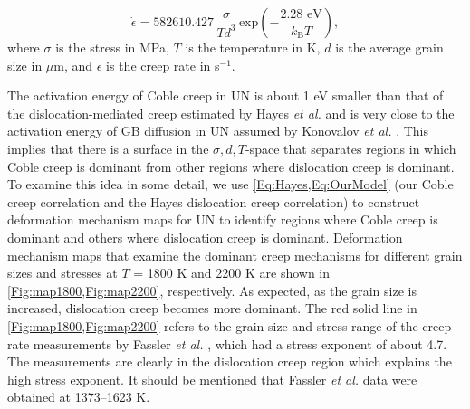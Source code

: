 \documentclass[preprint,12pt,sort&compress]{elsarticle} %
\newcommand{\?}{\stackrel{?}{=}}
\providecommand{\DIFaddbegin}{\protect\color{blue}} %
\providecommand{\DIFaddend}{\protect\color{black}} %
\providecommand{\DIFdelbegin}{\protect\color{red}} %
\providecommand{\DIFdelend}{\protect\color{black}} %
\newcommand{\DIFscaledelfig}{0.5}
\newlength{\DIFdelgraphicswidth} %
\newlength{\DIFdelgraphicsheight} %
\newcommand{\DIFaddincludegraphics}[2][]{{\color{blue}\fbox{\DIFOincludegraphics[#1]{#2}}}} %
\newcommand{\DIFdelincludegraphics}[2][]{%
\sbox{\DIFdelgraphicsbox}{\DIFOincludegraphics[#1]{#2}}%
\settoboxwidth{\DIFdelgraphicswidth}{\DIFdelgraphicsbox} %
\settoboxtotalheight{\DIFdelgraphicsheight}{\DIFdelgraphicsbox} %
\scalebox{\DIFscaledelfig}{%
\parbox[b]{\DIFdelgraphicswidth}{\usebox{\DIFdelgraphicsbox}\\[-\baselineskip] \rule{\DIFdelgraphicswidth}{0em}}\llap{\resizebox{\DIFdelgraphicswidth}{\DIFdelgraphicsheight}{%
\setlength{\unitlength}{\DIFdelgraphicswidth}%
\begin{picture}(1,1)%
\thicklines\linethickness{2pt} %
{\color[rgb]{1,0,0}\put(0,0){\framebox(1,1){}}}%
{\color[rgb]{1,0,0}\put(0,0){\line( 1,1){1}}}%
{\color[rgb]{1,0,0}\put(0,1){\line(1,-1){1}}}%
\end{picture}%
}\hspace*{3pt}}} %
} %
\DeclareRobustCommand{\DIFaddbegin}{\DIFOaddbegin \let\includegraphics\DIFaddincludegraphics} %
\DeclareRobustCommand{\DIFaddend}{\DIFOaddend \let\includegraphics\DIFOincludegraphics} %
\DeclareRobustCommand{\DIFdelbegin}{\DIFOdelbegin \let\includegraphics\DIFdelincludegraphics} %
\DeclareRobustCommand{\DIFdelend}{\DIFOaddend \let\includegraphics\DIFOincludegraphics} %
\begin{document}
\DIFdelbegin %
\DIFdelend \DIFaddbegin \begin{equation}
    \dot{\epsilon} = 582610.427 \, \frac{\sigma}{T d^3} \, \mathrm{exp} \! \left( - \frac{2.28 \text{ eV}}{k_\mathrm{B} T} \right),
    \label{Eq:OurModel}
\end{equation}\DIFaddend 
where $\sigma$ is the stress in MPa, $T$ is the temperature in K, $d$ is the average grain size in $\mu$m, and $\Dot{\epsilon}$ is the creep rate in s$^{-1}$. 

The activation energy of Coble creep in UN is about 1 eV smaller than that of the dislocation-mediated creep estimated by Hayes \textit{et al.} \cite{Hayes1990II} and is very close to the activation energy of GB diffusion in UN assumed by Konovalov \textit{et al.} \cite{Konovalov2016}. This implies that there is a surface in the $\sigma, d, T$-space that separates regions in which Coble creep is dominant from other regions where dislocation creep is dominant. To examine this idea in some detail, we use \cref{Eq:Hayes,Eq:OurModel} (our Coble creep correlation and the Hayes dislocation creep correlation) to construct deformation mechanism maps for UN to identify regions where Coble creep is dominant and others where dislocation creep is dominant. Deformation mechanism maps that examine the dominant creep mechanisms for different grain sizes and stresses at $T$ = 1800 K and 2200 K are shown in \cref{Fig:map1800,Fig:map2200}, respectively. As expected, as the grain size is increased, dislocation creep becomes more dominant. The red solid line in \cref{Fig:map1800,Fig:map2200} refers to the grain size and stress range of the creep rate measurements by Fassler \textit{et al.} \cite{Fassler1965}, which had a stress exponent of about 4.7. The measurements are clearly in the dislocation creep region which explains the high stress exponent. It should be mentioned that Fassler \textit{et al.} data were obtained at 1373--1623 K.
\end{document}
